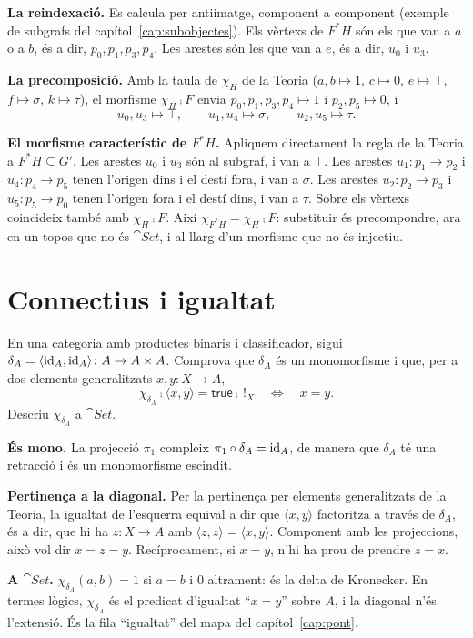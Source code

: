 \begin{solucio}
\textbf{La reindexació.} Es calcula per antiimatge, component a component (exemple de subgrafs del capítol~\ref{cap:subobjectes}). Els vèrtexs de $F^{*}H$ són els que van a $a$ o a $b$, és a dir, $p_0,p_1,p_3,p_4$. Les arestes són les que van a $e$, és a dir, $u_0$ i $u_3$.

\textbf{La precomposició.} Amb la taula de $\chi_H$ de la Teoria ($a,b\mapsto1$, $c\mapsto0$, $e\mapsto\top$, $f\mapsto\sigma$, $k\mapsto\tau$), el morfisme $\chi_H\comp F$ envia $p_0,p_1,p_3,p_4\mapsto1$ i $p_2,p_5\mapsto0$, i
\[
u_0,u_3\mapsto\top,\qquad u_1,u_4\mapsto\sigma,\qquad u_2,u_5\mapsto\tau.
\]

\textbf{El morfisme característic de $F^{*}H$.} Apliquem directament la regla de la Teoria a $F^{*}H\subseteq G'$. Les arestes $u_0$ i $u_3$ són al subgraf, i van a $\top$. Les arestes $u_1\colon p_1\to p_2$ i $u_4\colon p_4\to p_5$ tenen l'origen dins i el destí fora, i van a $\sigma$. Les arestes $u_2\colon p_2\to p_3$ i $u_5\colon p_5\to p_0$ tenen l'origen fora i el destí dins, i van a $\tau$. Sobre els vèrtexs coincideix també amb $\chi_H\comp F$. Així $\chi_{F^{*}H}=\chi_H\comp F$: substituir és precompondre, ara en un topos que no és $\cat{Set}$, i al llarg d'un morfisme que no és injectiu.
\end{solucio}

\section{Connectius i igualtat}

\begin{exercici}\label{pr-igualtat-omega}
En una categoria amb productes binaris i classificador, sigui $\delta_A=\langle\operatorname{id}_A,\operatorname{id}_A\rangle\colon A\to A\times A$. Comprova que $\delta_A$ és un monomorfisme i que, per a dos elements generalitzats $x,y\colon X\to A$,
\[
\chi_{\delta_A}\comp\langle x,y\rangle=\mathsf{true}\comp\,!_X
\quad\Longleftrightarrow\quad
x=y.
\]
Descriu $\chi_{\delta_A}$ a $\cat{Set}$.
\end{exercici}

\begin{solucio}
\textbf{És mono.} La projecció $\pi_1$ compleix $\pi_1\circ\delta_A=\operatorname{id}_A$, de manera que $\delta_A$ té una retracció i és un monomorfisme escindit.

\textbf{Pertinença a la diagonal.} Per la pertinença per elements generalitzats de la Teoria, la igualtat de l'esquerra equival a dir que $\langle x,y\rangle$ factoritza a través de $\delta_A$, és a dir, que hi ha $z\colon X\to A$ amb $\langle z,z\rangle=\langle x,y\rangle$. Component amb les projeccions, això vol dir $x=z=y$. Recíprocament, si $x=y$, n'hi ha prou de prendre $z=x$.

\textbf{A $\cat{Set}$.} $\chi_{\delta_A}(a,b)=1$ si $a=b$ i $0$ altrament: és la delta de Kronecker. En termes lògics, $\chi_{\delta_A}$ és el predicat d'igualtat \enquote{$x=y$} sobre $A$, i la diagonal n'és l'extensió. És la fila \enquote{igualtat} del mapa del capítol~\ref{cap:pont}.
\end{solucio}

